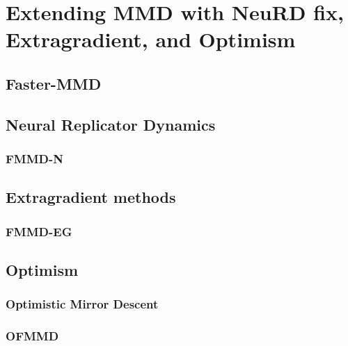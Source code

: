 \chapter{Extending MMD with NeuRD fix, Extragradient, and Optimism}

\section{Faster-MMD}

\section{Neural Replicator Dynamics}
\subsection{FMMD-N}

\section{Extragradient methods}

\subsection{FMMD-EG}

\section{Optimism}

\subsection{Optimistic Mirror Descent}

\subsection{OFMMD}